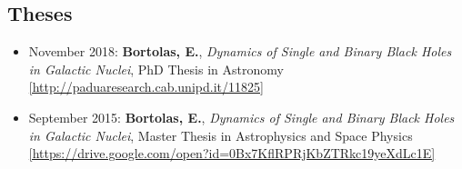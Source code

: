 \documentclass[11pt,a4paper]{article}
\begin{document}
\subsection*{Theses}


\begin{itemize}
   \item {\normalfont November 2018:} {\bf Bortolas, E.}, {\it Dynamics of Single and Binary Black Holes in Galactic Nuclei}, PhD Thesis in Astronomy \href{http://paduaresearch.cab.unipd.it/11825}{\scriptsize [http://paduaresearch.cab.unipd.it/11825]}
  \item {\normalfont September 2015:} {\bf Bortolas, E.}, {\it Dynamics of Single and Binary Black Holes in Galactic Nuclei}, Master Thesis in Astrophysics and Space Physics \href{https://drive.google.com/open?id=0Bx7KflRPRjKbZTRkc19yeXdLc1E}{\scriptsize [https://drive.google.com/open?id=0Bx7KflRPRjKbZTRkc19yeXdLc1E]}
\end{itemize}


\begin{comment}
\noindent\rule{\textwidth}{0.1pt}
\subsection{References}
\begin{itemize}
\setlength\itemsep{-2pt}

\item Prof Massimo \textsc{Dotti}; Universit\`a degli Studi di Milano-Bicocca; massimo.dotti@mib.infn.it

\item Dr Alessia \textsc{Gualandris}; University of Surrey; a.gualandris@surrey.ac.uk

\item Prof Michela \textsc{Mapelli}; Leopold Franzens Universit\"at Innsbruck {\it and} INAF -- Osservatorio Astronomico di Padova; michela.mapelli@oapd.inaf.it

\item Prof Justin I. \textsc{Read}, University of Surrey; j.read@surrey.ac.uk
\end{itemize}
\end{comment}
\end{document}
